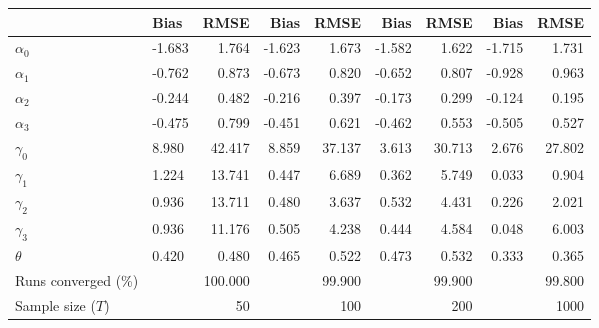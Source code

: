 
\begin{tabular}[t]{llrrrrrrr}
\toprule
  & Bias & RMSE & Bias & RMSE & Bias & RMSE & Bias & RMSE\\
\midrule
$\alpha_{0}$ & -1.683 & 1.764 & -1.623 & 1.673 & -1.582 & 1.622 & -1.715 & 1.731\\
$\alpha_{1}$ & -0.762 & 0.873 & -0.673 & 0.820 & -0.652 & 0.807 & -0.928 & 0.963\\
$\alpha_{2}$ & -0.244 & 0.482 & -0.216 & 0.397 & -0.173 & 0.299 & -0.124 & 0.195\\
$\alpha_{3}$ & -0.475 & 0.799 & -0.451 & 0.621 & -0.462 & 0.553 & -0.505 & 0.527\\
$\gamma_{0}$ & 8.980 & 42.417 & 8.859 & 37.137 & 3.613 & 30.713 & 2.676 & 27.802\\
$\gamma_{1}$ & 1.224 & 13.741 & 0.447 & 6.689 & 0.362 & 5.749 & 0.033 & 0.904\\
$\gamma_{2}$ & 0.936 & 13.711 & 0.480 & 3.637 & 0.532 & 4.431 & 0.226 & 2.021\\
$\gamma_{3}$ & 0.936 & 11.176 & 0.505 & 4.238 & 0.444 & 4.584 & 0.048 & 6.003\\
$\theta$ & 0.420 & 0.480 & 0.465 & 0.522 & 0.473 & 0.532 & 0.333 & 0.365\\
Runs converged (\%) &  & 100.000 &  & 99.900 &  & 99.900 &  & 99.800\\
Sample size ($T$) &  & 50 &  & 100 &  & 200 &  & 1000\\
\bottomrule
\end{tabular}
